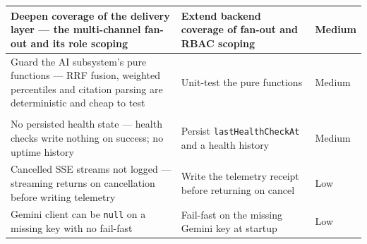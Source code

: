 \begin{longtable}{@{}>{\raggedright\arraybackslash}p{6.3cm}>{\raggedright\arraybackslash}p{6.5cm}>{\raggedright\arraybackslash}p{1.4cm}@{}}
\midrule
Deepen coverage of the delivery layer --- the multi-channel fan-out and its role scoping & Extend backend coverage of fan-out and RBAC scoping & Medium \\
\midrule
Guard the AI subsystem's pure functions --- RRF fusion, weighted percentiles and citation parsing are deterministic and cheap to test & Unit-test the pure functions & Medium \\
\midrule
\multicolumn{3}{@{}l}{\textbf{DevOps}} \\*
\addlinespace[2pt]
No persisted health state --- health checks write nothing on success; no uptime history & Persist \texttt{lastHealthCheckAt} and a health history & Medium \\
\midrule
Cancelled SSE streams not logged --- streaming returns on cancellation before writing telemetry & Write the telemetry receipt before returning on cancel & Low \\
\midrule
Gemini client can be \texttt{null} on a missing key with no fail-fast & Fail-fast on the missing Gemini key at startup & Low \\
\bottomrule
\end{longtable}
